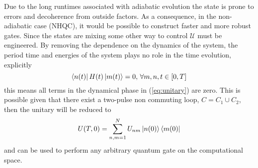 Due to the long runtimes associated with adiabatic evolution the state is prone to errors and decoherence from outside factors\cite{NHQC}. As a consequence, in the non-adiabatic case (NHQC), it would be possible to construct faster and more robust gates. Since the states are mixing some other way to control $\mathcal{U}$ must be engineered. By removing the dependence on the dynamics of the system, the period time and energies of the system plays no role in the time evolution, explicitly 
\begin{equation}
\bra{n(t)}H(t)\ket{m(t)} = 0,\,\forall m,n, t\in[0,T]
\end{equation} 
this means all terms in the dynamical phase in (\ref{eq:unitary}) are zero.
This is possible given that there exist a two-pulse non commuting loop, $C = C_1 \cup C_2$\cite{NHQC,sLoop}, 
then the unitary will be reduced to 
\begin{equation}
U(T,0) = \sum_{n,m = 1}^{N} U_{nm}\ket{n(0)}\bra{m(0)}
\end{equation}
and can be used to perform any arbitrary quantum gate on the computational space.


